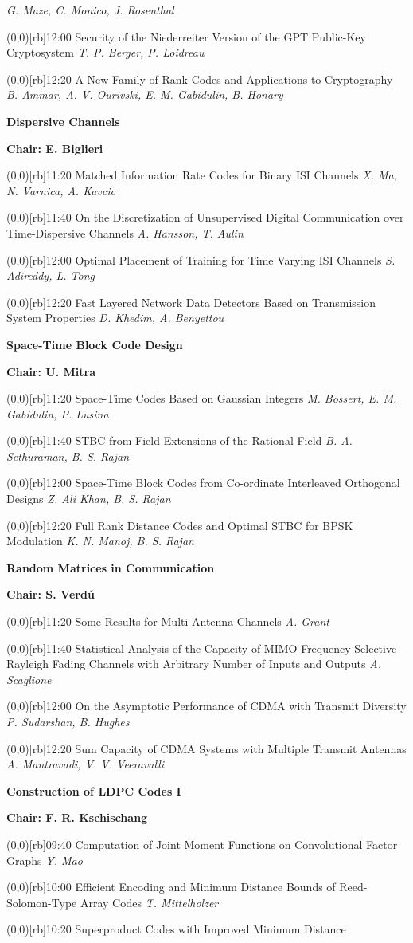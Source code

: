 \documentclass[a5paper,twoside]{article}
\def\period#1{\flushleft{\large\bfseries #1}\markboth{\sf #1}{\sf #1}}
\def\sesstitle#1{\vspace{.45\bigskipamount}\par{\bfseries #1}\par}
\def\sesschair#1{{\bfseries Chair: #1}\par\vspace{.65\medskipamount}}
\def\papertime#1{\makebox(0,0)[rb]{{\scriptsize #1}\hspace{.5em}}}
\def\papertitle#1{#1\hfil\break}
\def\paperauthors#1{{\itshape #1}\par\filbreak\vspace{.65\medskipamount}}
\begin{document}
\paperauthors{G. Maze, C. Monico, J. Rosenthal}
\papertime{12:00}%
\papertitle{Security of the Niederreiter Version of the GPT Public-Key Cryptosystem}
\paperauthors{T. P. Berger, P. Loidreau}
\papertime{12:20}%
\papertitle{A New Family of Rank Codes and Applications to Cryptography}
\paperauthors{B. Ammar, A. V. Ourivski, E. M. Gabidulin, B. Honary}
\sesstitle{Dispersive Channels}
\sesschair{E. Biglieri}
\papertime{11:20}%
\papertitle{Matched Information Rate Codes for Binary ISI Channels}
\paperauthors{X. Ma, N. Varnica, A. Kavcic}
\papertime{11:40}%
\papertitle{On the Discretization of Unsupervised Digital Communication over Time-Dispersive Channels}
\paperauthors{A. Hansson, T. Aulin}
\papertime{12:00}%
\papertitle{Optimal Placement of Training for Time Varying ISI Channels}
\paperauthors{S. Adireddy, L. Tong}
\papertime{12:20}%
\papertitle{Fast Layered Network Data Detectors Based on Transmission System Properties}
\paperauthors{D. Khedim, A. Benyettou}
\sesstitle{Space-Time Block Code Design}
\sesschair{U. Mitra}
\papertime{11:20}%
\papertitle{Space-Time Codes Based on Gaussian Integers}
\paperauthors{M. Bossert, E. M. Gabidulin, P. Lusina}
\papertime{11:40}%
\papertitle{STBC from Field Extensions of the Rational Field}
\paperauthors{B. A. Sethuraman, B. S. Rajan}
\papertime{12:00}%
\papertitle{Space-Time Block Codes from Co-ordinate Interleaved Orthogonal Designs}
\paperauthors{Z. Ali Khan, B. S. Rajan}
\papertime{12:20}%
\papertitle{Full Rank Distance Codes and Optimal STBC for BPSK Modulation}
\paperauthors{K. N. Manoj, B. S. Rajan}
\sesstitle{Random Matrices in Communication}
\sesschair{S. Verd\'u}
\papertime{11:20}%
\papertitle{Some Results for Multi-Antenna Channels}
\paperauthors{A. Grant}
\papertime{11:40}%
\papertitle{Statistical Analysis of the Capacity of MIMO Frequency Selective Rayleigh Fading Channels with Arbitrary Number of Inputs and Outputs}
\paperauthors{A. Scaglione}
\papertime{12:00}%
\papertitle{On the Asymptotic Performance of CDMA with Transmit Diversity}
\paperauthors{P. Sudarshan, B. Hughes}
\papertime{12:20}%
\papertitle{Sum Capacity of CDMA Systems with Multiple Transmit Antennas}
\paperauthors{A. Mantravadi, V. V. Veeravalli}
\period{Thu 09:40 -- 11:00}
\sesstitle{Construction of LDPC Codes I}
\sesschair{F. R. Kschischang}
\papertime{09:40}%
\papertitle{Computation of Joint Moment Functions on Convolutional Factor Graphs}
\paperauthors{Y. Mao}
\papertime{10:00}%
\papertitle{Efficient Encoding and Minimum Distance Bounds of Reed-Solomon-Type Array Codes}
\paperauthors{T. Mittelholzer}
\papertime{10:20}%
\papertitle{Superproduct Codes with Improved Minimum Distance}
\end{document}

